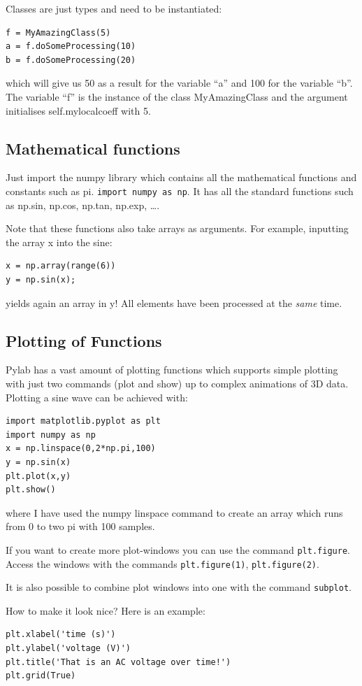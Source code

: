 \documentclass[12pt,a4paper]{article}
\begin{document}
Classes are just types and need to be instantiated:
\begin{verbatim}
f = MyAmazingClass(5)
a = f.doSomeProcessing(10)
b = f.doSomeProcessing(20)
\end{verbatim}
which will give us 50 as a result for the variable ``a'' and
100 for the variable ``b''. The variable ``f'' is the instance
of the class MyAmazingClass and the argument initialises
self.mylocalcoeff with 5.


\subsection{Mathematical functions}
Just import the numpy library which contains all the
mathematical functions and constants such as pi.
\texttt{import numpy as np}. It has all the standard functions such
as np.sin, np.cos, np.tan, np.exp, \ldots.

Note that these functions also take arrays as arguments. For example,
inputting the array x into the sine:
\begin{verbatim}
x = np.array(range(6))
y = np.sin(x);
\end{verbatim}
yields again an array in y! All elements have been processed at the 
\emph{same} time.


\subsection{Plotting of Functions}
Pylab has a vast amount of plotting functions which supports simple plotting
with just two commands (plot and show) up to complex animations of 3D data.
Plotting a sine wave can be achieved with:
\begin{verbatim} 
import matplotlib.pyplot as plt
import numpy as np
x = np.linspace(0,2*np.pi,100)
y = np.sin(x)
plt.plot(x,y)
plt.show()
\end{verbatim}
where I have used the numpy linspace command to create an array which
runs from 0 to two pi with 100 samples.

If you want to create more plot-windows you can use the command
\texttt{plt.figure}. Access the windows with the commands \texttt{plt.figure(1)},
\texttt{plt.figure(2)}.

It is also possible to combine plot windows into one with the
command \texttt{subplot}.

How to make it look nice? Here is an example:
\begin{verbatim}
plt.xlabel('time (s)')
plt.ylabel('voltage (V)')
plt.title('That is an AC voltage over time!')
plt.grid(True)
\end{verbatim}
\end{document}
